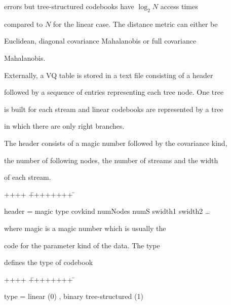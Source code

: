 errors but tree-structured codebooks have $\log_2 N$ access times


compared to $N$ for the linear case.  The distance metric can either be


Euclidean, diagonal covariance Mahalanobis or full covariance


Mahalanobis.










Externally, a VQ table is stored in a text file consisting of a header


followed by a sequence of entries representing each tree node.  One tree


is built for each stream and linear codebooks are represented by a tree


in which there are only right branches.





The header consists of a magic number followed by the covariance kind,


the number of following nodes, the number of streams and the width


of each stream.


{\sf


\begin{tabbing}


++++ \= ++++++++ \=  \kill


\>  header =\> magic type covkind numNodes numS swidth1 swidth2  \ldots


\end{tabbing}


}


\noindent


where {\sf magic} is a magic number which is usually the


code for the parameter kind of the data.  The {\sf type}


defines the type of codebook


{\sf


\begin{tabbing}


++++ \= ++++++++ \=  \kill


\>  type =\> linear (0) , binary tree-structured (1)


\end{tabbing}


}


